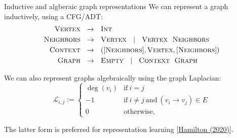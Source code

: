 \documentclass{beamer}
\begin{document}
    \begin{frame}[fragile]{Inductive and algberaic graph representations}
        We can represent a graph inductively, using a CFG/ADT:
        \begin{align*}
           \textsc{Vertex} &\phantom{\vee}\rightarrow\phantom{\vee} \textsc{Int}\\
           \textsc{Neighbors} &\phantom{\vee}\rightarrow\phantom{\vee} \textsc{Vertex}\phantom{\vee} \mid \phantom{\vee}\textsc{Vertex} \phantom{\vee} \textsc{Neighbors} \\
           \textsc{Context} &\phantom{\vee}\rightarrow\phantom{\vee} ([\textsc{Neighbors}], \textsc{Vertex}, [\textsc{Neighbors}]) \\
           \textsc{Graph} &\phantom{\vee}\rightarrow\phantom{\vee} \textsc{Empty}\phantom{\vee} \mid\phantom{\vee} \textsc{Context} \phantom{\vee} \textsc{Graph}
        \end{align*}

        We can also represent graphs algebraically using the graph Laplacian:
        \[
            \mathcal{L}_{i,j} := \begin{cases}
               \deg(v_i) & \mbox{if}\ i = j \\
               -1 & \mbox{if}\ i \neq j\ \mbox{and}\ (v_i \rightarrow v_j) \in E \\
               0 & \mbox{otherwise},
        \end{cases}\]

        The latter form is preferred for representation learning [\href{https://www.cs.mcgill.ca/~wlh/grl_book/}{Hamilton (2020)}].
    \end{frame}
\end{document}
